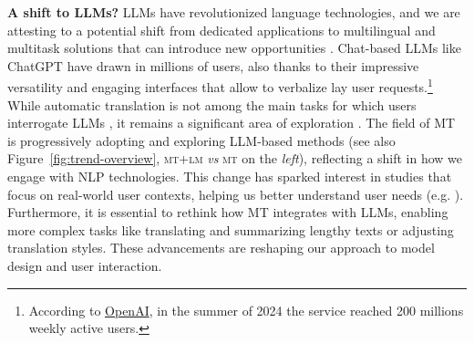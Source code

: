 


\textbf{A shift to LLMs?}
LLMs have revolutionized language technologies, and we are attesting to a potential shift from dedicated applications to multilingual and multitask solutions that can introduce new opportunities \citep{haque2022think}. Chat-based LLMs like ChatGPT have drawn in millions of users, also thanks to their impressive versatility and engaging interfaces that allow to verbalize lay user requests.\footnote{According to \href{https://www.reuters.com/technology/artificial-intelligence/openai-says-chatgpts/weekly-users-have-grown-200-million-2024-08-29/}{OpenAI}, in the summer of 2024  the service reached 200 millions weekly active users.} 
%
While automatic translation is not among the main tasks for which users interrogate LLMs \citep{ouyang-etal-2023-shifted}, it remains a significant area of exploration \citep{zhu2023multilingual, lyu2024paradigm}. The field of MT is progressively adopting and exploring LLM-based methods (see also Figure~\ref{fig:trend-overview}, \textsc{mt+lm} \emph{vs} \textsc{mt} on the \emph{left}), reflecting a shift in how we engage with NLP technologies. This change has sparked interest in studies that focus on real-world user contexts, helping us better understand user needs (e.g. \citet{tao-etal-2024-chatgpt, Skjuve_Brandtzaeg_Følstad_2024, Kim_2024, STOJANOV2024100243, bodonhelyi2024userintentrecognitionsatisfaction, wang2024user, HYUNBAEK2023102030}).
%
Furthermore, it is essential to rethink how MT integrates with LLMs, enabling more complex tasks like translating and summarizing lengthy texts or adjusting translation styles. These advancements are reshaping our approach to model design and user interaction.
%

